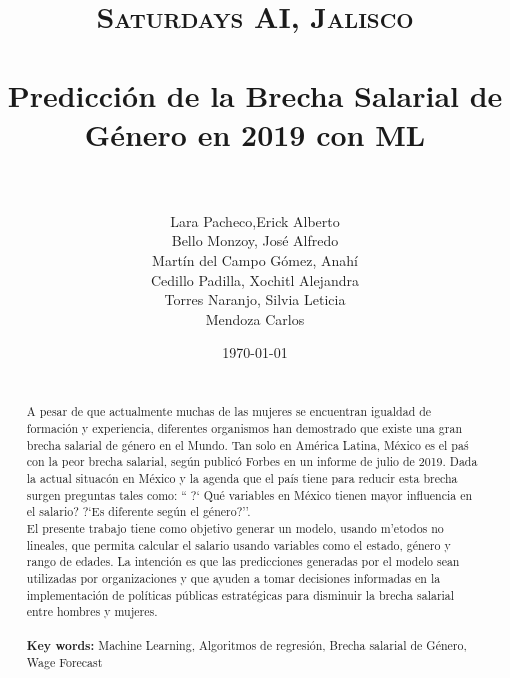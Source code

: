 \documentclass[paper=a4, fontsize=11pt]{scrartcl} %
\title{	
\normalfont \normalsize 
\textsc{Saturdays AI, Jalisco} \\ [25pt] %
\horrule{0.5pt} \\[0.4cm] %
\huge  Predicci\'on de la Brecha Salarial de G\'enero en 2019 con ML \\ %
\horrule{2pt} \\[0.5cm] %
}
\author{  Lara Pacheco,Erick Alberto \\ Bello Monzoy, Jos\'e Alfredo \\ Mart\'in del Campo G\'omez, Anah\'i \\ Cedillo Padilla, Xochitl Alejandra \\ Torres Naranjo, Silvia Leticia \\ Mendoza Carlos} %
\date{\normalsize\today} %
\numberwithin{equation}{section} %
\numberwithin{figure}{section} %
\numberwithin{table}{section} %
\begin{document}
\maketitle %

\newpage
\begin{abstract}

{ }\\
A pesar de que actualmente muchas de las mujeres se encuentran igualdad de formaci\'on y experiencia, diferentes organismos han demostrado que existe una gran brecha salarial de g\'enero en el Mundo. Tan solo en Am\'erica Latina, México es el pa\'s con la peor brecha salarial, seg\'un public\'o Forbes en un informe de julio de 2019. Dada la actual situac\'on en M\'exico y la agenda que el pa\'is tiene para reducir esta brecha surgen preguntas tales como: `` ?` Qu\'e variables en M\'exico tienen mayor influencia en el salario? ?`Es diferente seg\'un el g\'enero?''.
\\El presente trabajo tiene como objetivo generar un modelo, usando m'etodos no lineales, que permita calcular el salario usando variables como el estado, g\'enero y rango de edades. La intenci\'on es que las predicciones generadas por el modelo sean utilizadas por organizaciones y que ayuden a tomar decisiones informadas en la implementaci\'on de pol\'iticas p\'ublicas estrat\'egicas para disminuir la brecha salarial entre hombres y mujeres.
\\
\\
\textbf{Key words:} Machine Learning, Algoritmos de regresi\'on, Brecha salarial de G\'enero, Wage Forecast
    
\end{abstract}

\newpage
\tableofcontents










\newpage


\end{document}
